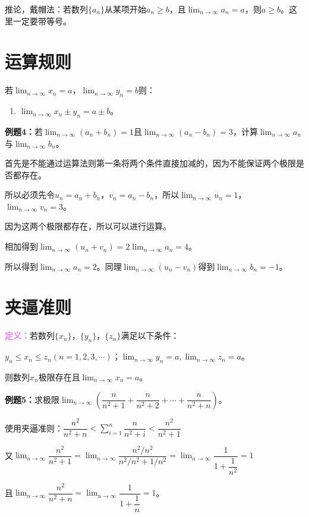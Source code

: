 \documentclass[UTF8]{ctexart}
\begin{document}
推论，戴帽法：若数列$\{a_n\}$从某项开始$a_n\geqslant b$，且$\lim_{n\to\infty}a_n=a$，则$a\geqslant b$。这里一定要带等号。

\section{运算规则}

若$\lim_{n\to\infty}x_n=a$，$\lim_{n\to\infty}y_n=b$则：

\begin{enumerate}
    \item $\lim_{n\to\infty}x_n\pm y_n=a\pm b$。
\end{enumerate}

\textbf{例题4：}若$\lim_{n\to\infty}(a_n+b_n)=1$且$\lim_{n\to\infty}(a_n-b_n)=3$，计算$\lim_{n\to\infty}a_n$与$\lim_{n\to\infty}b_n$。

首先是不能通过运算法则第一条将两个条件直接加减的，因为不能保证两个极限是否都存在。

所以必须先令$u_n=a_n+b_n$，$v_n=a_n-b_n$，所以$\lim_{n\to\infty}u_n=1$，$\lim_{n\to\infty}v_n=3$。

因为这两个极限都存在，所以可以进行运算。

相加得到$\lim_{n\to\infty}(u_n+v_n)=2\lim_{n\to\infty}a_n=4$。

所以得到$\lim_{n\to\infty}a_n=2$。同理$\lim_{n\to\infty}(u_n-v_n)$得到$\lim_{n\to\infty}b_n=-1$。

\section{夹逼准则}

\textcolor{violet}{\textbf{定义：}}若数列$\{x_n\}$，$\{y_n\}$，$\{z_n\}$满足以下条件：

$y_n\leqslant x_n\leqslant z_n(n=1,2,3,\cdots)$；$\lim_{n\to\infty}y_n=a,\lim_{n\to\infty}z_n=a$。

则数列$x_n$极限存在且$\lim_{n\to\infty}x_n=a$。

\textbf{例题5：}求极限$\lim_{n\to\infty}\left(\dfrac{n}{n^2+1}+\dfrac{n}{n^2+2}+\cdots+\dfrac{n}{n^2+n}\right)$。

使用夹逼准则：$\dfrac{n^2}{n^2+n}<\sum_{i=1}^n\dfrac{n}{n^2+i}<\dfrac{n^2}{n^2+1}$

又$\lim_{n\to\infty}\dfrac{n^2}{n^2+1}=\lim_{n\to\infty}\dfrac{n^2/n^2}{n^2/n^2+1/n^2}=\lim_{n\to\infty}\dfrac{1}{1+\dfrac{1}{n^2}}=1$

且$\lim_{n\to\infty}\dfrac{n^2}{n^2+n}=\lim_{n\to\infty}\dfrac{1}{1+\dfrac{1}{n}}=1$。
\end{document}
